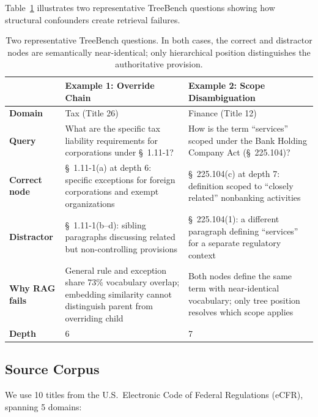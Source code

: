 \documentclass[11pt]{article}
\begin{document}
Table~\ref{tab:examples} illustrates two representative TreeBench questions showing how structural confounders create retrieval failures.

\begin{table}[t]
\centering
\small
\begin{tabular}{p{1.8cm}p{6.5cm}p{6.5cm}}
\toprule
& \textbf{Example 1: Override Chain} & \textbf{Example 2: Scope Disambiguation} \\
\midrule
\textbf{Domain} & Tax (Title 26) & Finance (Title 12) \\
\textbf{Query} & What are the specific tax liability requirements for corporations under \S~1.11-1? & How is the term ``services'' scoped under the Bank Holding Company Act (\S~225.104)? \\
\textbf{Correct node} & \S~1.11-1(a) at depth 6: specific exceptions for foreign corporations and exempt organizations & \S~225.104(c) at depth 7: definition scoped to ``closely related'' nonbanking activities \\
\textbf{Distractor} & \S~1.11-1(b--d): sibling paragraphs discussing related but non-controlling provisions & \S~225.104(1): a different paragraph defining ``services'' for a separate regulatory context \\
\textbf{Why RAG fails} & General rule and exception share 73\% vocabulary overlap; embedding similarity cannot distinguish parent from overriding child & Both nodes define the same term with near-identical vocabulary; only tree position resolves which scope applies \\
\textbf{Depth} & 6 & 7 \\
\bottomrule
\end{tabular}
\caption{Two representative TreeBench questions. In both cases, the correct and distractor nodes are semantically near-identical; only hierarchical position distinguishes the authoritative provision.}
\label{tab:examples}
\end{table}

\subsection{Source Corpus}

We use 10 titles from the U.S.\ Electronic Code of Federal Regulations (eCFR), spanning 5 domains:
\end{document}
